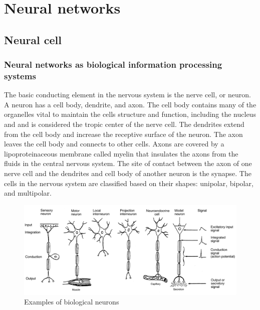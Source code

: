\chapter{Neural networks}

\section{Neural cell}

\subsection{Neural networks as biological information processing systems}
\FloatBarrier
The basic conducting element in the nervous system is the nerve cell, or neuron.
A neuron has a cell body, dendrite, and axon. The cell body contains many of the organelles 
vital to maintain the cells structure and function, including the nucleus and and is considered the
tropic center of the nerve cell.
The dendrites extend from the cell body and increase the receptive surface of the neuron.
The axon leaves the cell body and connects to other cells. Axons are covered by a lipoproteinaceous
membrane called myelin that insulates the axons from the fluids in the central nervous system.
The site of contact between the axon of one nerve cell and the dendrites and cell body of another 
neuron is the synapse. The cells in the nervous system are classified based on their shapes:
unipolar, bipolar, and multipolar. 
\begin{figure}[htb] 
	\label{fig:neurons}
	\centering
	\includegraphics[width=\textwidth]{figures/bio_neurons}
	\caption{Examples of biological neurons}
\end{figure}
